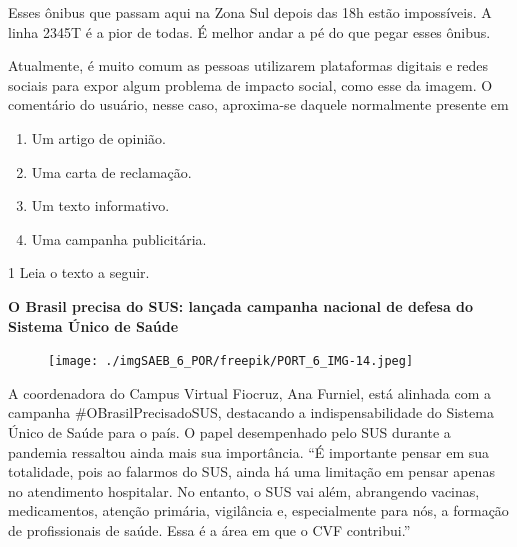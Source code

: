 Esses ônibus que passam aqui na Zona Sul depois das 18h estão
impossíveis. A linha 2345T é a pior de todas. É melhor andar a pé do que
pegar esses ônibus.

Atualmente, é muito comum as pessoas utilizarem plataformas digitais e
redes sociais para expor algum problema de impacto social, como esse da
imagem. O comentário do usuário, nesse caso, aproxima-se daquele
normalmente presente em

\begin{enumerate}
\def\labelenumi{\alph{enumi})}
\item Um artigo de opinião.
\item Uma carta de reclamação.
\item Um texto informativo.
\item Uma campanha publicitária.
\end{enumerate}



\num{1} Leia o texto a seguir.

\textbf{O Brasil precisa do SUS: lançada campanha nacional de defesa do
Sistema Único de Saúde}

\begin{figure}
\texttt{[image: ./imgSAEB\_6\_POR/freepik/PORT\_6\_IMG-14.jpeg]}
\end{figure}

A coordenadora do Campus Virtual Fiocruz, Ana Furniel, está alinhada com
a campanha \#OBrasilPrecisadoSUS, destacando a indispensabilidade do
Sistema Único de Saúde para o país. O papel desempenhado pelo SUS
durante a pandemia ressaltou ainda mais sua importância. ``É importante
pensar em sua totalidade, pois ao falarmos do SUS, ainda há uma
limitação em pensar apenas no atendimento hospitalar. No entanto, o SUS
vai além, abrangendo vacinas, medicamentos, atenção primária, vigilância
e, especialmente para nós, a formação de profissionais de saúde. Essa é
a área em que o CVF contribui.''

